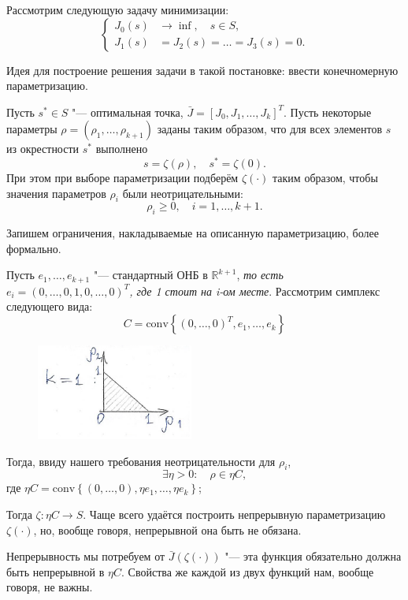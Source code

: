 \documentclass[12pt, a4paper]{article}
\theoremstyle{rusdef}
\newcommand{\R}{\ensuremath{\mathbb{R}}} %
\begin{document}
Рассмотрим следующую задачу минимизации:
\[
  \left\{
  \begin{aligned}
    J_0(s) & \to \inf, \quad  s \in S,       \\
    J_1(s) & = J_2(s) = \ldots = J_3(s) = 0.
  \end{aligned}
  \right.
\]

Идея для построение решения задачи в такой постановке: ввести конечномерную параметризацию.

Пусть $s^* \in S$ "--- оптимальная точка, $\bar{J} = [J_0, J_1, \ldots, J_k]^T$. Пусть некоторые параметры $\rho = (\rho_1, \ldots, \rho_{k+1})$ заданы таким образом, что для всех элементов $s$ из окрестности $s^*$ выполнено
\[
  s = \zeta(\rho), \quad s^* = \zeta(0).
\]
При этом при выборе параметризации подберём $\zeta(\cdot)$ таким образом, чтобы значения параметров $\rho_i$ были неотрицательными:
\[
  \rho_i \geqslant 0, \quad i = 1, \ldots, k+1.
\]

Запишем ограничения, накладываемые на описанную параметризацию, более формально.

Пусть $e_1, \ldots, e_{k+1}$ "--- стандартный ОНБ в $\R^{k+1}$, \textit{то есть \\ ${e_i = (0,\ldots,0,1,0,\ldots,0)^T}$, где 1 стоит на i-ом месте}. Рассмотрим симплекс следующего вида:
\[
  C = \mathrm{conv} \left\{ (0,\ldots,0)^T, e_1, \ldots, e_k \right\}
\]

\begin{figure}[ht]
  \center
  \includegraphics{pic1.png}
\end{figure}

Тогда, ввиду нашего требования неотрицательности для $\rho_i$,
\[
  \exists \eta > 0\colon \quad \rho \in \eta C,
\]
где $\eta C = \mathrm{conv} \left\{ (0,\ldots,0), \eta e_1, \ldots, \eta e_k \right\}$;

Тогда $\zeta \colon \eta C \to S$. Чаще всего удаётся построить непрерывную параметризацию $\zeta(\cdot)$, но, вообще говоря, непрерывной она быть не обязана.

Непрерывность мы потребуем от $\bar{J}(\zeta(\cdot))$ "--- эта функция обязательно должна быть непрерывной в $\eta C$. Свойства же каждой из двух функций нам, вообще говоря, не важны.
\end{document}

